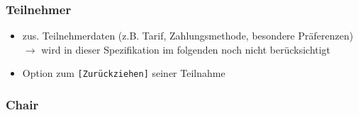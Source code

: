 \documentclass[headexclude,footexclude,12pt,BCOR0pt,DIV15]{scrartcl}
\begin{document}
        \subsubsection{Teilnehmer}
        \begin{itemize}
            \item zus. Teilnehmerdaten (z.B. Tarif, Zahlungsmethode, besondere Pr\"{a}ferenzen)
                  $\longrightarrow$ wird in dieser Spezifikation im folgenden noch nicht ber\"{u}cksichtigt
            \item Option zum \texttt{[Zur\"{u}ckziehen]} seiner Teilnahme
        \end{itemize}

        \subsubsection{Chair}
\end{document}
